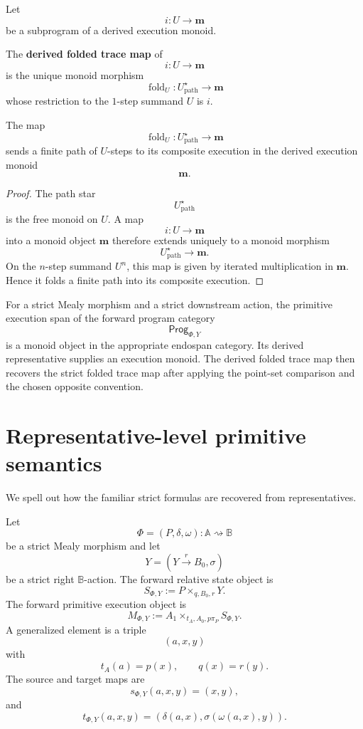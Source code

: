 Let
\[
i:U\to\mathbf m
\]
be a subprogram of a derived execution monoid.

\begin{definition}
\label{def:derived-folded-trace-map}
The \textbf{derived folded trace map} of
\[
i:U\to\mathbf m
\]
is the unique monoid morphism
\[
\operatorname{fold}_U:
U^\star_{\mathrm{path}}\to\mathbf m
\]
whose restriction to the \(1\)-step summand \(U\) is \(i\).
\end{definition}

\begin{proposition}
\label{prop:meaning-derived-folded-trace}
The map
\[
\operatorname{fold}_U:
U^\star_{\mathrm{path}}\to\mathbf m
\]
sends a finite path of \(U\)-steps to its composite execution in the derived
execution monoid
\[
\mathbf m.
\]
\end{proposition}

\begin{proof}
The path star
\[
U^\star_{\mathrm{path}}
\]
is the free monoid on \(U\). A map
\[
i:U\to\mathbf m
\]
into a monoid object \(\mathbf m\) therefore extends uniquely to a monoid
morphism
\[
U^\star_{\mathrm{path}}\to\mathbf m.
\]
On the \(n\)-step summand \(U^n\), this map is given by iterated
multiplication in \(\mathbf m\). Hence it folds a finite path into its
composite execution.
\end{proof}

\begin{remark}
\label{rem:strict-comparison-folded-derived}
For a strict Mealy morphism and a strict downstream action, the primitive
execution span of the forward program category
\[
\mathsf{Prog}_{\Phi,Y}
\]
is a monoid object in the appropriate endospan category. Its derived
representative supplies an execution monoid. The derived folded trace map then
recovers the strict folded trace map after applying the point-set comparison
and the chosen opposite convention.
\end{remark}

\section{Representative-level primitive semantics}
\label{sec:representative-level-primitive-semantics}

We spell out how the familiar strict formulas are recovered from
representatives.

Let
\[
\Phi=(P,\delta,\omega):\mathbb A\rightsquigarrow\mathbb B
\]
be a strict Mealy morphism and let
\[
Y=(Y\xrightarrow{r}B_0,\sigma)
\]
be a strict right \(\mathbb B\)-action. The forward relative state object is
\[
S_{\Phi,Y}:=P\times_{q,B_0,r}Y.
\]
The forward primitive execution object is
\[
M_{\Phi,Y}
:=
A_1\times_{t_A,A_0,p\pi_P}S_{\Phi,Y}.
\]
A generalized element is a triple
\[
(a,x,y)
\]
with
\[
t_A(a)=p(x),
\qquad
q(x)=r(y).
\]
The source and target maps are
\[
s_{\Phi,Y}(a,x,y)=(x,y),
\]
and
\[
t_{\Phi,Y}(a,x,y)
=
\left(
\delta(a,x),
\sigma(\omega(a,x),y)
\right).
\]

